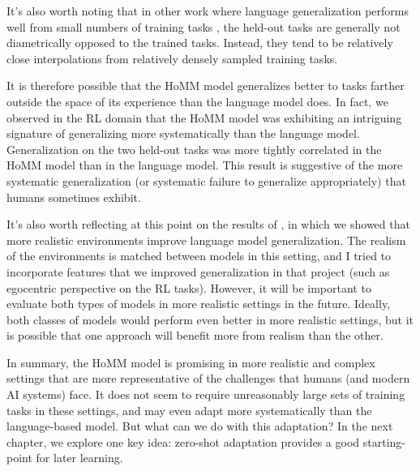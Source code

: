 It's also worth noting that in other work where language generalization performs well from small numbers of training tasks \citep[e.g. our work in ][]{Hill2019a}, the held-out tasks are generally not diametrically opposed to the trained tasks. Instead, they tend to be relatively close interpolations from relatively densely sampled training tasks. \par 

It is therefore possible that the HoMM model generalizes better to tasks farther outside the space of its experience than the language model does. In fact, we observed in the RL domain that the HoMM model was exhibiting an intriguing signature of generalizing more systematically than the language model. Generalization on the two held-out tasks was more tightly correlated in the HoMM model than in the language model. %
This result is suggestive of the more systematic generalization (or systematic failure to generalize appropriately) that humans sometimes exhibit. \par

It's also worth reflecting at this point on the results of \citet{Hill2019a}, in which we showed that more realistic environments improve language model generalization. The realism of the environments is matched between models in this setting, and I tried to incorporate features that we improved generalization in that project (such as egocentric perspective on the RL tasks). However, it will be important to evaluate both types of models in more realistic settings in the future. Ideally, both classes of models would perform even better in more realistic settings, but it is possible that one approach will benefit more from realism than the other. \par

In summary, the HoMM model is promising in more realistic and complex settings that are more representative of the challenges that humans (and modern AI systems) face. It does not seem to require unreasonably large sets of training tasks in these settings, and may even adapt more systematically than the language-based model. But what can we do with this adaptation? In the next chapter, we explore one key idea: zero-shot adaptation provides a good starting-point for later learning. 



